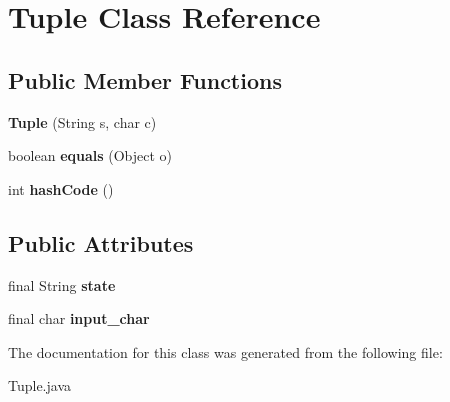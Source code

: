 \hypertarget{class_tuple}{}\section{Tuple Class Reference}
\label{class_tuple}
\subsection*{Public Member Functions}
\begin{DoxyCompactItemize}
\item 
\mbox{\label{class_tuple_a4590880adeefb89c5dfc81f144f9b31c}} 
{\bfseries Tuple} (String s, char c)
\item 
\mbox{\label{class_tuple_a0ad127877b01322c5a44654f652edc03}} 
boolean {\bfseries equals} (Object o)
\item 
\mbox{\label{class_tuple_a0d80ee57375cb242c3ea84e30a92e899}} 
int {\bfseries hash\+Code} ()
\end{DoxyCompactItemize}
\subsection*{Public Attributes}
\begin{DoxyCompactItemize}
\item 
\mbox{\label{class_tuple_a9c4480b85cf8c1a77ade09c08869f2ca}} 
final String {\bfseries state}
\item 
\mbox{\label{class_tuple_abefbba6f4c0f7d3bcc2c1d59d0be2c08}} 
final char {\bfseries input\+\_\+char}
\end{DoxyCompactItemize}


The documentation for this class was generated from the following file\+:\begin{DoxyCompactItemize}
\item 
Tuple.\+java\end{DoxyCompactItemize}
